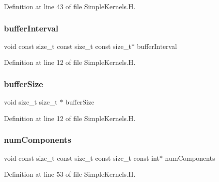 Definition at line 43 of file Simple\+Kernels.\+H.

\hypertarget{SimpleKernels_8H_a53ab06d6b324b77670d28550daa25d14}{}\label{SimpleKernels_8H_a53ab06d6b324b77670d28550daa25d14} 
\subsubsection{\texorpdfstring{buffer\+Interval}{bufferInterval}}
{\footnotesize\ttfamily void const size\+\_\+t const size\+\_\+t const size\+\_\+t$\ast$ buffer\+Interval}



Definition at line 12 of file Simple\+Kernels.\+H.

\hypertarget{SimpleKernels_8H_ac77f5c22ba0f12d03d5b658f0d0117b4}{}\label{SimpleKernels_8H_ac77f5c22ba0f12d03d5b658f0d0117b4} 
\subsubsection{\texorpdfstring{buffer\+Size}{bufferSize}}
{\footnotesize\ttfamily void size\+\_\+t size\+\_\+t $\ast$ buffer\+Size}



Definition at line 12 of file Simple\+Kernels.\+H.

\hypertarget{SimpleKernels_8H_abb39988074870d597c8d1cfcf61514ee}{}\label{SimpleKernels_8H_abb39988074870d597c8d1cfcf61514ee} 
\subsubsection{\texorpdfstring{num\+Components}{numComponents}}
{\footnotesize\ttfamily void const size\+\_\+t const size\+\_\+t const size\+\_\+t const int$\ast$ num\+Components}



Definition at line 53 of file Simple\+Kernels.\+H.

\hypertarget{SimpleKernels_8H_ab847e17018c49a895984dc0c0ce0c2c9}{}\label{SimpleKernels_8H_ab847e17018c49a895984dc0c0ce0c2c9} 
